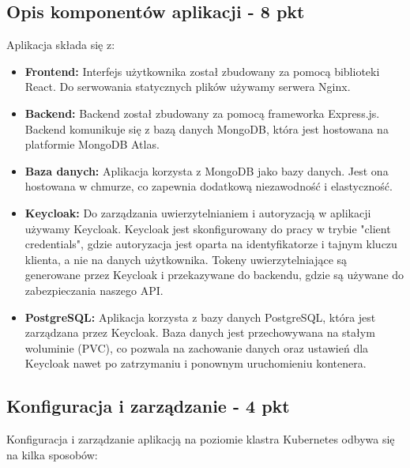 \documentclass[12pt,a4paper]{article}
\begin{document}
\subsection{Opis komponentów aplikacji - 8 pkt}
\label{sec:FunctionalConditions}

Aplikacja składa się z:

\begin{itemize}
\item \textbf{Frontend:} Interfejs użytkownika został zbudowany za pomocą biblioteki React. Do serwowania statycznych plików używamy serwera Nginx.

\item \textbf{Backend:} Backend został zbudowany za pomocą frameworka Express.js. Backend komunikuje się z bazą danych MongoDB, która jest hostowana na platformie MongoDB Atlas.

\item \textbf{Baza danych:} Aplikacja korzysta z MongoDB jako bazy danych. Jest ona hostowana w chmurze, co zapewnia dodatkową niezawodność i elastyczność.

\item \textbf{Keycloak:} Do zarządzania uwierzytelnianiem i autoryzacją w aplikacji używamy Keycloak. Keycloak jest skonfigurowany do pracy w trybie "client credentials", gdzie autoryzacja jest oparta na identyfikatorze i tajnym kluczu klienta, a nie na danych użytkownika. Tokeny uwierzytelniające są generowane przez Keycloak i przekazywane do backendu, gdzie są używane do zabezpieczania naszego API.

\item \textbf{PostgreSQL:} Aplikacja korzysta z bazy danych PostgreSQL, która jest zarządzana przez Keycloak. Baza danych jest przechowywana na stałym woluminie (PVC), co pozwala na zachowanie danych oraz ustawień dla Keycloak nawet po zatrzymaniu i ponownym uruchomieniu kontenera.
\end{itemize}

\subsection{Konfiguracja i zarządzanie - 4 pkt}
\label{sec:NonFunctionalConditions}

Konfiguracja i zarządzanie aplikacją na poziomie klastra Kubernetes odbywa się na kilka sposobów:
\end{document}
